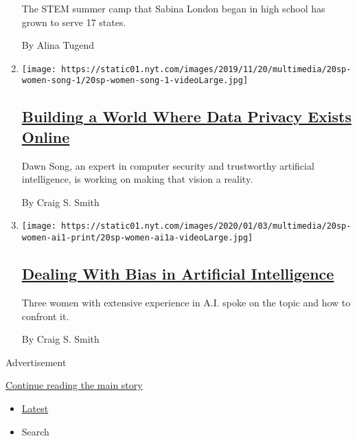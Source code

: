 \begin{enumerate}
  The STEM summer camp that Sabina London began in high school has grown
  to serve 17 states.

  By Alina Tugend
\item
  \texttt{[image: https://static01.nyt.com/images/2019/11/20/multimedia/20sp-women-song-1/20sp-women-song-1-videoLarge.jpg]}

  \hypertarget{building-a-world-where-data-privacy-exists-online}{%
  \subsection{\texorpdfstring{\href{/2019/11/19/technology/artificial-intelligence-dawn-song.html}{Building
  a World Where Data Privacy Exists
  Online}}{Building a World Where Data Privacy Exists Online}}\label{building-a-world-where-data-privacy-exists-online}}

  Dawn Song, an expert in computer security and trustworthy artificial
  intelligence, is working on making that vision a reality.

  By Craig S. Smith
\item
  \texttt{[image: https://static01.nyt.com/images/2020/01/03/multimedia/20sp-women-ai1-print/20sp-women-ai1a-videoLarge.jpg]}

  \hypertarget{dealing-with-bias-in-artificial-intelligence}{%
  \subsection{\texorpdfstring{\href{/2019/11/19/technology/artificial-intelligence-bias.html}{Dealing
  With Bias in Artificial
  Intelligence}}{Dealing With Bias in Artificial Intelligence}}\label{dealing-with-bias-in-artificial-intelligence}}

  Three women with extensive experience in A.I. spoke on the topic and
  how to confront it.

  By Craig S. Smith
\end{enumerate}

Advertisement

\protect\hyperlink{after-mid1}{Continue reading the main story}

\begin{itemize}
\tightlist
\item
  \protect\hyperlink{stream-panel}{Latest}
\item
  Search
\end{itemize}

